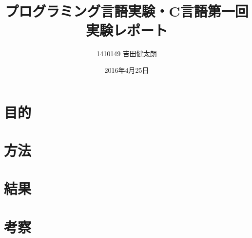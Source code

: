 \documentclass[a4j]{jarticle}
\date{2016年4月25日}
\author{1410149 吉田健太朗}
\title{プログラミング言語実験・C言語第一回実験レポート}
\begin{document}
\maketitle

\section{目的}


\section{方法}




\section{結果}


\section{考察}

\end{document}
